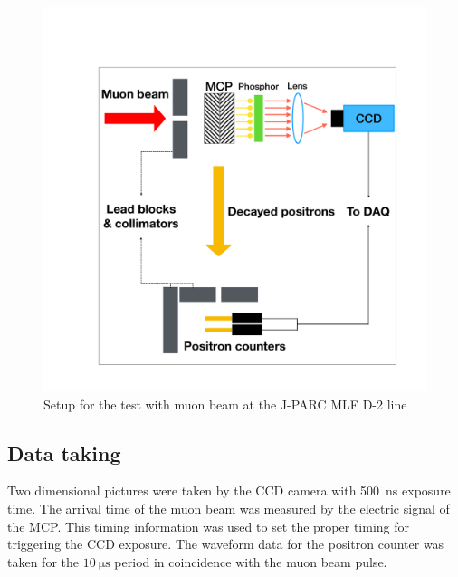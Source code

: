 \documentclass[preprint,3p,twocolumn]{elsarticle}
\begin{document}
\begin{figure}[tb]
{\setlength{\belowdisplayskip}{0pt}
\begin{minipage}[t]{60mm}
\includegraphics[width=1.25\textwidth, height=1.25\textwidth]{figure/BPM_schematic_2.pdf}
\end{minipage}
}
\caption{Setup for the test with muon beam at the J-PARC MLF D-2
  line}
\vspace{-0.4cm}
\label{fig:simulation}
\end{figure}

\subsection{Data taking} 

Two dimensional pictures were taken by the CCD camera with
\SI{500}{\nano\s} exposure time.  The arrival time of the muon
beam was measured by the electric signal of the MCP. This timing
information was used to set the proper timing for triggering the
CCD exposure. The waveform data for the positron counter was
taken for the $\SI{10}{\micro\s}$ period in coincidence with the
muon beam pulse.
\end{document}
